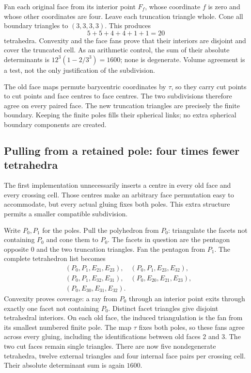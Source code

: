 Fan each original face from its interior point $F_f$, whose coordinate $f$
is zero and whose other coordinates are four. Leave each truncation triangle
whole. Cone all boundary triangles to $(3,3,3,3)$. This produces
\[
 5+5+4+4+1+1=20
\]
tetrahedra. Convexity and the face fans prove that their interiors are
disjoint and cover the truncated cell. As an arithmetic control, the sum of
their absolute determinants is
$12^3(1-2/3^3)=1600$; none is degenerate. Volume agreement is a test, not
the only justification of the subdivision.

The old face maps permute barycentric coordinates by $\tau$, so they carry
cut points to cut points and face centres to face centres. The two
subdivisions therefore agree on every paired face. The new truncation
triangles are precisely the finite boundary. Keeping the finite poles fills
their spherical links; no extra spherical boundary components are created.

\subsection{Pulling from a retained pole: four times fewer tetrahedra}

The first implementation unnecessarily inserts a centre in every old face
and every crossing cell. Those centres make an arbitrary face permutation
easy to accommodate, but every actual gluing fixes both poles. This extra
structure permits a smaller compatible subdivision.

Write $P_0,P_1$ for the poles. Pull the polyhedron from $P_0$: triangulate
the facets not containing $P_0$ and cone them to $P_0$. The facets in question
are the pentagon opposite $0$ and the two truncation triangles. Fan the
pentagon from $P_1$. The complete tetrahedron list becomes
\[
\begin{split}
 &(P_0,P_1,E_{21},E_{23}),\quad (P_0,P_1,E_{23},E_{32}),\\
 &(P_0,P_1,E_{32},E_{31}),\quad (P_0,E_{20},E_{21},E_{23}),\\
 &(P_0,E_{30},E_{31},E_{32}).
\end{split}
\]
Convexity proves coverage: a ray from $P_0$ through an interior point exits
through exactly one facet not containing $P_0$. Distinct facet triangles
give disjoint tetrahedral interiors. On each old face, the induced
triangulation is the fan from its smallest numbered finite pole. The map
$\tau$ fixes both poles, so these fans agree across every gluing, including
the identifications between old faces $2$ and $3$. The two cut faces remain
single triangles. There are now five nondegenerate tetrahedra, twelve
external triangles and four internal face pairs per crossing cell. Their
absolute determinant sum is again $1600$.

